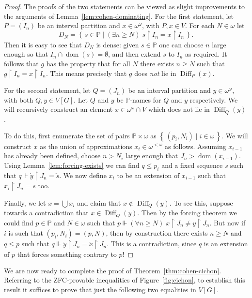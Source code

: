 \documentclass[11pt,oneside]{amsbook}
\newcommand{\set}[1]{\left\{\,#1\,\right\}}
\newcommand{\PP}{\mathbb P}
\newcommand{\forces}{\Vdash}
\DeclareMathOperator{\dom}{dom}
\DeclareMathOperator{\Diff}{Diff}
\theoremstyle{definition}
\theoremstyle{plain}
\theoremstyle{definition}
\theoremstyle{remark}
\numberwithin{equation}{section}
\numberwithin{figure}{section}
\begin{document}
\begin{proof}
  The proofs of the two statements can be viewed as slight improvements to the arguments of Lemma~\ref{lem:cohen-dominating}. For the first statement, let $P=(I_n)$ be an interval partition and $x\in\omega^\omega$, with $P,x\in V$. For each $N\in\omega$ let
  \[D_N=\set{s\in\PP\mid(\exists n\geq N)\;s\restriction I_n=x\restriction I_n}\text{.}
  \]
  Then it is easy to see that $D_N$ is dense: given $s\in\PP$ one can choose $n$ large enough so that $I_n\cap\dom(s)=\emptyset$, and then extend $s$ to $I_n$ as required. It follows that $g$ has the property that for all $N$ there exists $n\geq N$ such that $g\restriction I_n=x\restriction I_n$. This means precisely that $g$ does \emph{not} lie in $\Diff_P(x)$.

  For the second statement, let $Q=(J_n)$ be an interval partition and $y\in\omega^\omega$, with both $Q,y\in V[G]$. Let $\dot Q$ and $\dot y$ be $\PP$-names for $Q$ and $y$ respectively. We will recursively construct an element $x\in\omega^\omega\cap V$ which does not lie in $\Diff_Q(y)$.

  To do this, first enumerate the set of pairs $\PP\times\omega$ as $\set{(p_i,N_i)\mid i\in\omega}$. We will construct $x$ as the union of approximations $x_i\in\omega^{<\omega}$ as follows. Assuming $x_{i-1}$ has already been defined, choose $n>N_i$ large enough that $J_n>\dom(x_{i-1})$. Using Lemma~\ref{lem:forcing-exists} we can find $q\leq p_i$ and a fixed sequence $s$ such that $q\forces \dot y\restriction J_n=\check s$. We now define $x_i$ to be an extension of $x_{i-1}$ such that $x_i\restriction J_n=s$ too.

  Finally, we let $x=\bigcup x_i$ and claim that $x\notin\Diff_Q(y)$. To see this, suppose towards a contradiction that $x\in\Diff_Q(y)$. Then by the forcing theorem we could find $p\in\PP$ and $N\in\omega$ such that $p\forces(\forall n\geq N)\;x\restriction J_n\neq y\restriction J_n$. But now if $i$ is such that $(p_i,N_i)=(p,N)$, then by construction there exists $n\geq N$ and $q\leq p$ such that $q\forces\dot y\restriction J_n=\check x\restriction J_n$. This is a contradiction, since $q$ is an extension of $p$ that forces something contrary to $p$!
\end{proof}


We are now ready to complete the proof of Theorem~\ref{thm:cohen-cichon}. Referring to the ZFC-provable inequalities of Figure~\ref{fig:cichon}, to establish this result it suffices to prove that just the following two equalities in $V[G]$.
\end{document}
